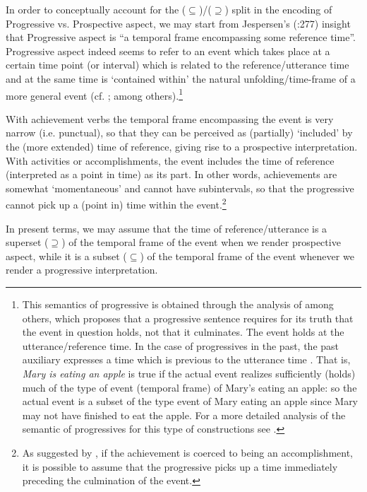 \documentclass[output=paper,modfonts,nonflat,newtxmath,colorlinks,citecolor=brown]{langsci/langscibook}
\begin{document}
In order to conceptually account for the (${\subseteq}$)/(${\supseteq}$) split in the encoding of Progressive {vs}. Prospective aspect, we may start from Jespersen’s (\citeyear{Jespersen1924}:277) insight that Progressive aspect is “a temporal frame encompassing some reference time”. Progressive aspect indeed seems to refer to an event which takes place at a certain time point (or interval) which is related to the reference/utterance time and at the same time is  ‘contained within’ the natural unfolding/time-frame of a more general event (cf. \citealt{Dowty1979, Higginbotham2004}; among others).\footnote{This semantics of progressive is obtained through the analysis of \citet{Higginbotham2009, Parsons1989, Landman1992} among others, which proposes that a progressive sentence requires for its truth that the event in question {holds}, not that it {culminates}. The event holds at the utterance/reference time. In the case of progressives in the past, the past auxiliary expresses a time which is previous to the utterance time \citep{Higginbotham2009}. That is, \textit{Mary is eating an apple} is true if the actual event realizes sufficiently (holds) much of the type of event (temporal frame) of {Mary’s eating an apple}: so the actual event is a subset of the type event of {Mary eating an appl}e since Mary may not have finished to eat the apple. For a more detailed analysis of the semantic of progressives for this type of constructions see \citet{ManziniEtAl2017}.}  

With achievement verbs the temporal frame encompassing the event is very narrow (i.e. punctual), so that they can be perceived as (partially) ‘included’ by the (more extended) time of reference, giving rise to a prospective interpretation. With activities or accomplishments, the event includes the time of reference (interpreted as a point in time) as its part. In other words, achievements are somewhat ‘momentaneous’ and cannot have subintervals, so that the progressive cannot pick up a (point in) time within the event.\footnote{As suggested by \citet{Rothstein2004}, if the achievement is coerced to being an accomplishment, it is possible to assume that the progressive picks up a time immediately preceding the culmination of the event.} 

In present terms, we may assume that the time of reference/utterance is a superset (${\supseteq}$) of the temporal frame of the event when we render prospective aspect, while it is a subset (${\subseteq}$) of the temporal frame of the event whenever we render a progressive interpretation.
\end{document}
